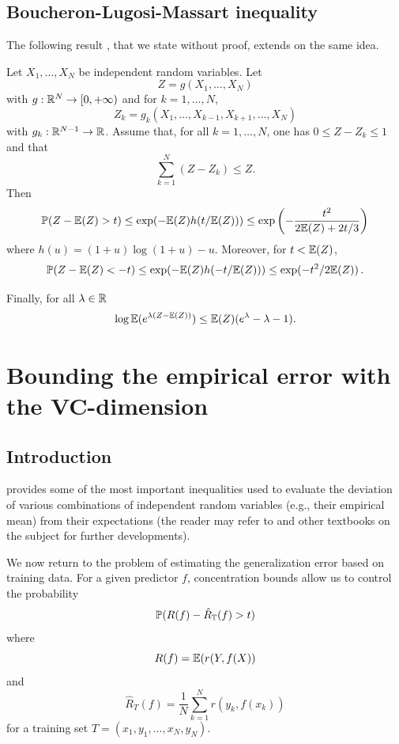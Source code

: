 \subsection{Boucheron-Lugosi-Massart inequality}
The following result \citep{boucheron2000sharp}, that we state without proof, extends on the same idea.
\begin{theorem}
\label{th:blm}
Let $X_1, \ldots, X_N$ be independent random variables. Let 
\[
Z = g(X_1, \ldots, X_N)
\]
 with $g: {\mathbb{R}}^N \to [0, +\infty)$ and for $k=1, \ldots, N$, 
\[
Z_k = g_k(X_1, \ldots, X_{k-1}, X_{k+1}, \ldots, X_N)
\]
with $g_k: {\mathbb{R}}^{N-1} \to {\mathbb{R}}$. Assume that, for all $k=1, \ldots, N$, one has $0\leq Z-Z_k \leq 1$ and that 
\[
\sum_{k=1}^N (Z-Z_k) \leq Z.
\]
Then 
\[
\bm{\mathbb P}(Z - \bm{\mathbb E}(Z) > t) \leq \exp(-\bm{\mathbb E}(Z) h(t/\bm{\mathbb E}(Z))) \leq \exp\left(-\frac{t^2}{2\bm{\mathbb E}(Z) +2t/3}\right)
\]
where $h(u) = (1+u) \log(1+u) - u$. Moreover, for $t < \bm{\mathbb E}(Z)$,
\[
\bm{\mathbb P}(Z - \bm{\mathbb E}(Z) < -t) \leq \exp(-\bm{\mathbb E}(Z) h(-t/\bm{\mathbb E}(Z))) \leq \exp(- t^2/2\bm{\mathbb E}(Z))\,.
\]

Finally, for all $\lambda\in {\mathbb{R}}$
\begin{equation}
\label{eq:blm}
\log \bm{\mathbb E}(e^{\lambda(Z-\bm{\mathbb E}(Z))}) \leq \bm{\mathbb E}(Z) (e^\lambda - \lambda - 1).
\end{equation}
\end{theorem}



\section{Bounding the empirical error with the VC-dimension}

\subsection{Introduction}
  provides some of the most important inequalities used to evaluate the deviation of various combinations of independent random variables (e.g., their empirical mean) from their expectations (the reader may refer to \citet{ledoux1991probability,dgl96,talagrand2006generic,dembo2011large,vershynin2018high} and other textbooks on the subject for further developments). 

We now return to   the problem of estimating the generalization error based on training data.
 For a given predictor $f$, concentration bounds allow us to control the probability
\[
\bm{\mathbb P}(R(f) - \hat R_{\mathbb T}(f) > t)
\]
where
\[
R(f) = \bm{\mathbb E}(r(Y, f(X))
\]
and
\[
\hat R_T(f) = \frac{1}{N} \sum_{k=1}^N r(y_k, f(x_k))
\]
for a training set  $T = (x_1,y_1, \ldots, x_N, y_N)$.


